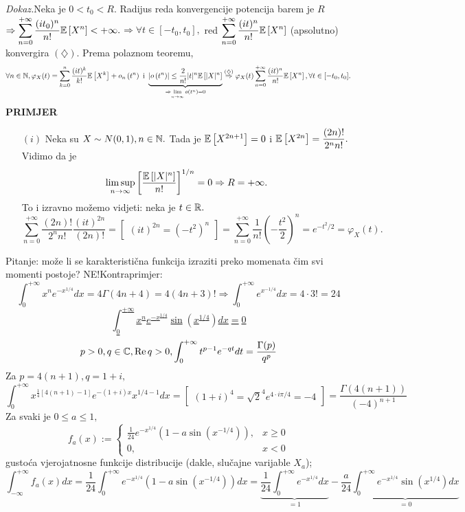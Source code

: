 \documentclass{article}
\newcommand{\myre}{\operatorname{Re}}
\newcommand{\mylimsup}{\underset{n\to\infty}{\lim\sup}}
\begin{document}
\textit{Dokaz.}\newline Neka je \(0<t_0<R.\) Radijus reda konvergencije potencija barem je \(R\) \(\Rightarrow\displaystyle \sum_{n=0}^{+\infty}\frac{(it_0)^n}{n!}\Bbb E\left[X^n\right]<+\infty.\)\newline \(\Rightarrow\forall t\in[-t_0,t_0],\) red \(\displaystyle\sum_{n=0}^{+\infty}\frac{(it)^n}{n!}\Bbb E\left[X^n\right]\) (apsolutno) konvergira \((\diamondsuit).\) Prema polaznom teoremu, \[\forall n\in\Bbb N,\varphi_X(t)=\sum_{k=0}^n\frac{(it)^k}{k!}\Bbb E\left[X^k\right]+o_n\left(t^n\right)\text{ i }\underbrace{\left|o\left(t^n\right)\right|\le\frac2{n!}|t|^n\Bbb E\left[|X|^n\right]}_{\Rightarrow\lim\limits_{n\to\infty}o\left(t^n\right)=0}\overset{(\diamondsuit)}{\Rightarrow}\varphi_X(t)\sum_{n=0}^{+\infty}\frac{(it)^n}{n!}\Bbb E\left[X^n\right],\forall t\in[-t_0,t_0].\]        
\textbf{PRIMJER}
\begin{enumerate}
    \item[\((i)\)] Neka su \(X\sim N(0,1),n\in\Bbb N.\) Tada je \(\Bbb E\left[X^{2n+1}\right]=0\) i \(\Bbb E\left[X^{2n}\right]=\dfrac{(2n)!}{2^nn!}.\) Vidimo da je \[\mylimsup \left[\frac{\Bbb E\left[|X|^n\right]}{n!}\right]^{1/n}=0\Rightarrow R=+\infty.\] To i izravno možemo vidjeti: neka je \(t\in\Bbb R.\) \[\sum_{n=0}^{+\infty}\frac{(2n)!}{2^nn!}\frac{(it)^{2n}}{(2n)!}=\begin{bmatrix}(it)^{2n}=(-t^2)^n\end{bmatrix}=\sum_{n=0}^{+\infty}\frac1{n!}\left(-\frac{t^2}2\right)^n=e^{-t^2/2}=\varphi_X(t).\]  
\end{enumerate}
Pitanje: može li se karakteristična funkcija izraziti preko momenata čim svi momenti postoje? NE!\newline Kontraprimjer: \[\int_0^{+\infty}x^ne^{-x^{1/4}}dx=4\Gamma(4n+4)=4(4n+3)!\Rightarrow\int_0^{+\infty}e^{x^{-1/4}}dx=4\cdot 3!=24\] \href{https://math.stackexchange.com/q/3289346/721644}{\[\int_0^{+\infty}x^ne^{-x^{1/4}}\sin\left(x^{1/4}\right)dx=0\]} \[p>0,q\in\Bbb C,\myre q>0,\int_0^{+\infty}t^{p-1}e^{-qt}dt=\frac{\Gamma(p)}{q^p}\] Za \(p=4(n+1),q=1+i,\) \[\int_0^{+\infty}x^{\frac14\left[4(n+1)-1\right]}e^{-(1+i)x}x^{1/4-1}dx=\begin{bmatrix}(1+i)^4=\sqrt 2^4e^{4\cdot i\pi/4}=-4\end{bmatrix}=\frac{\Gamma(4(n+1))}{(-4)^{n+1}}\]
Za svaki je \(0\le a\le 1,\) \[f_a(x):=\begin{cases}\frac1{24}e^{-x^{1/4}}\left(1-a\sin\left(x^{-1/4}\right)\right),&x\ge 0\\0,&x<0\end{cases}\] gustoća vjerojatnosne funkcije distribucije (dakle, slučajne varijable \(X_a\));\[\int_{-\infty}^{+\infty}f_a(x)dx=\frac1{24}\int_0^{+\infty}e^{-x^{1/4}}\left(1-a\sin\left(x^{-1/4}\right)\right)dx=\underbrace{\frac1{24}\int_0^{+\infty}e^{-x^{1/4}}dx}_{=1}-\frac{a}{24}\underbrace{\int_0^{+\infty}e^{-x^{1/4}}\sin\left(x^{1/4}\right)dx}_{=0}\] 
\end{document}

